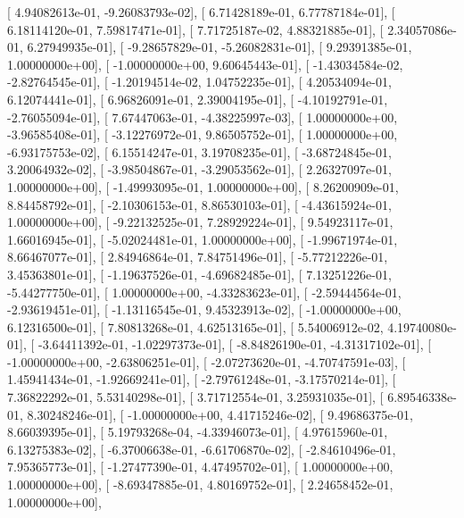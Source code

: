 \documentclass{article}
\begin{document}
       [  4.94082613e-01,  -9.26083793e-02],
       [  6.71428189e-01,   6.77787184e-01],
       [  6.18114120e-01,   7.59817471e-01],
       [  7.71725187e-02,   4.88321885e-01],
       [  2.34057086e-01,   6.27949935e-01],
       [ -9.28657829e-01,  -5.26082831e-01],
       [  9.29391385e-01,   1.00000000e+00],
       [ -1.00000000e+00,   9.60645443e-01],
       [ -1.43034584e-02,  -2.82764545e-01],
       [ -1.20194514e-02,   1.04752235e-01],
       [  4.20534094e-01,   6.12074441e-01],
       [  6.96826091e-01,   2.39004195e-01],
       [ -4.10192791e-01,  -2.76055094e-01],
       [  7.67447063e-01,  -4.38225997e-03],
       [  1.00000000e+00,  -3.96585408e-01],
       [ -3.12276972e-01,   9.86505752e-01],
       [  1.00000000e+00,  -6.93175753e-02],
       [  6.15514247e-01,   3.19708235e-01],
       [ -3.68724845e-01,   3.20064932e-02],
       [ -3.98504867e-01,  -3.29053562e-01],
       [  2.26327097e-01,   1.00000000e+00],
       [ -1.49993095e-01,   1.00000000e+00],
       [  8.26200909e-01,   8.84458792e-01],
       [ -2.10306153e-01,   8.86530103e-01],
       [ -4.43615924e-01,   1.00000000e+00],
       [ -9.22132525e-01,   7.28929224e-01],
       [  9.54923117e-01,   1.66016945e-01],
       [ -5.02024481e-01,   1.00000000e+00],
       [ -1.99671974e-01,   8.66467077e-01],
       [  2.84946864e-01,   7.84751496e-01],
       [ -5.77212226e-01,   3.45363801e-01],
       [ -1.19637526e-01,  -4.69682485e-01],
       [  7.13251226e-01,  -5.44277750e-01],
       [  1.00000000e+00,  -4.33283623e-01],
       [ -2.59444564e-01,  -2.93619451e-01],
       [ -1.13116545e-01,   9.45323913e-02],
       [ -1.00000000e+00,   6.12316500e-01],
       [  7.80813268e-01,   4.62513165e-01],
       [  5.54006912e-02,   4.19740080e-01],
       [ -3.64411392e-01,  -1.02297373e-01],
       [ -8.84826190e-01,  -4.31317102e-01],
       [ -1.00000000e+00,  -2.63806251e-01],
       [ -2.07273620e-01,  -4.70747591e-03],
       [  1.45941434e-01,  -1.92669241e-01],
       [ -2.79761248e-01,  -3.17570214e-01],
       [  7.36822292e-01,   5.53140298e-01],
       [  3.71712554e-01,   3.25931035e-01],
       [  6.89546338e-01,   8.30248246e-01],
       [ -1.00000000e+00,   4.41715246e-02],
       [  9.49686375e-01,   8.66039395e-01],
       [  5.19793268e-04,  -4.33946073e-01],
       [  4.97615960e-01,   6.13275383e-02],
       [ -6.37006638e-01,  -6.61706870e-02],
       [ -2.84610496e-01,   7.95365773e-01],
       [ -1.27477390e-01,   4.47495702e-01],
       [  1.00000000e+00,   1.00000000e+00],
       [ -8.69347885e-01,   4.80169752e-01],
       [  2.24658452e-01,   1.00000000e+00],
\end{document}
